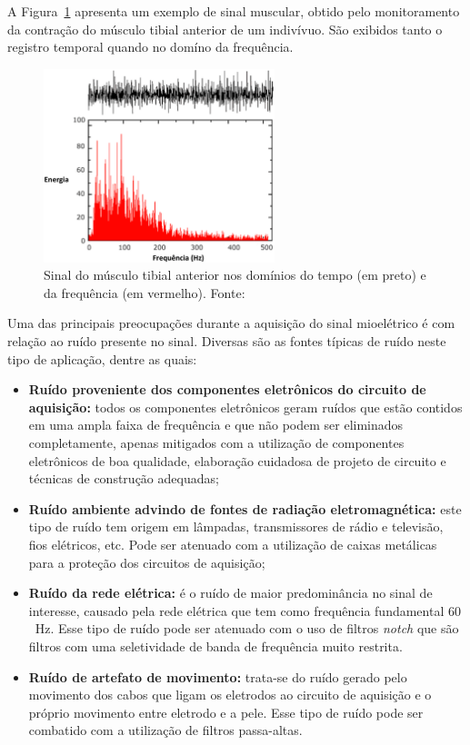 \documentclass[a4paper,11pt]{article}
\begin{document}
A Figura~\ref{fig:fft_emg} apresenta um exemplo de sinal muscular, obtido pelo monitoramento da contração do músculo tibial anterior de um indivívuo. São exibidos tanto o registro temporal quando no domíno da  frequência.

\begin{figure}[h]
  \centering
  \includegraphics[width=0.6\textwidth]{fig/fft_emg.eps}
	\caption {Sinal do músculo tibial anterior nos domínios do tempo (em preto) e da frequência (em vermelho). Fonte:~\parencite{DELUCA2002}}
  \label{fig:fft_emg}
\end{figure}

Uma das principais preocupações durante a aquisição do sinal mioelétrico é com relação ao ruído presente no sinal. Diversas são as fontes típicas de ruído neste tipo de aplicação, dentre as quais:

\begin{itemize}
  \item \textbf{Ruído proveniente dos  componentes eletrônicos do circuito de aquisição:} todos os componentes eletrônicos geram ruídos que estão contidos em uma ampla faixa de frequência e que não podem ser eliminados completamente, apenas mitigados com a utilização de componentes eletrônicos de boa qualidade, elaboração cuidadosa de projeto de circuito e técnicas de construção adequadas;
  \item \textbf{Ruído ambiente advindo de fontes de radiação eletromagnética:} este tipo de ruído tem origem em lâmpadas, transmissores de rádio e televisão, fios elétricos, etc. Pode ser atenuado com a utilização de caixas metálicas para a proteção dos circuitos de aquisição;
  \item \textbf{Ruído da rede elétrica:} é o ruído de maior predominância no sinal de interesse, causado pela rede elétrica que tem como frequência fundamental $60$~Hz. Esse tipo de ruído pode ser atenuado com o uso de filtros \textit{notch} que são filtros com uma seletividade de banda de frequência muito restrita. 
  \item \textbf{Ruído de artefato de movimento:} trata-se do ruído gerado pelo movimento dos cabos que ligam os eletrodos ao circuito de aquisição e o próprio movimento entre eletrodo e a pele. Esse tipo de ruído pode ser combatido com a utilização de filtros passa-altas.
\end{itemize}
\end{document}
